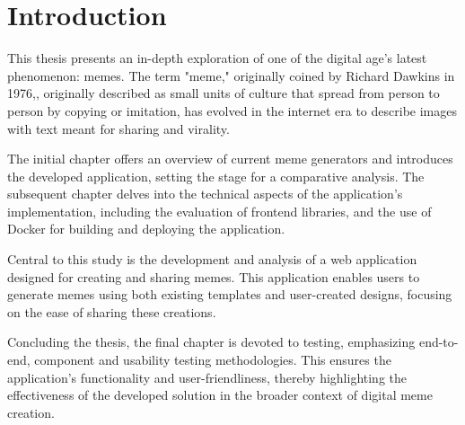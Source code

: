\chapter*{Introduction}
\setcounter{page}{1}



This thesis presents an in-depth exploration of one of the digital age's latest phenomenon: memes. The term "meme," originally coined by Richard Dawkins in 1976,\cite{meme}, originally described as small units of culture that spread from person to person by copying or imitation, has evolved in the internet era to describe images with text meant for sharing and virality.

The initial chapter offers an overview of current meme generators and introduces the developed application, setting the stage for a comparative analysis. The subsequent chapter delves into the technical aspects of the application's implementation, including the evaluation of frontend libraries, and the use of Docker for building and deploying the application.

Central to this study is the development and analysis of a web application designed for creating and sharing memes. This application enables users to generate memes using both existing templates and user-created designs, focusing on the ease of sharing these creations.

Concluding the thesis, the final chapter is devoted to testing, emphasizing end-to-end, component and usability testing methodologies. This ensures the application's functionality and user-friendliness, thereby highlighting the effectiveness of the developed solution in the broader context of digital meme creation.

